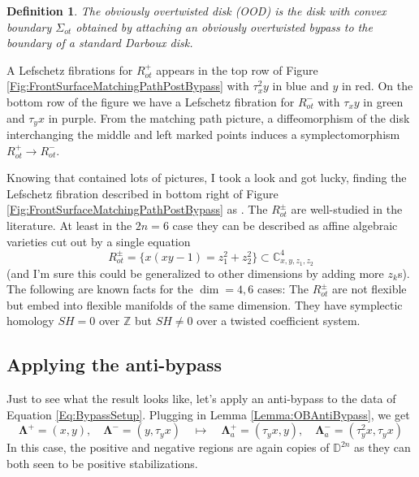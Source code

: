 \documentclass[11pt]{amsart}
\newcommand{\thicc}[1]{\pmb{#1}}
\newcommand{\C}{\mathbb{C}}
\newcommand{\Z}{\mathbb{Z}}
\newcommand{\disk}{\mathbb{D}}
\newcommand{\Leg}{\Lambda}
\newcommand{\thiccPosLeg}{\thicc{\Leg}^{+}}
\newcommand{\thiccNegLeg}{\thicc{\Leg}^{-}}
\newtheorem{defn}[thm]{Definition}
\begin{document}
\begin{defn}\label{Def:OOD}
The \emph{obviously overtwisted disk} (OOD) is the disk with convex boundary $\Sigma_{ot}$ obtained by attaching an obviously overtwisted bypass to the boundary of a standard Darboux disk.
\end{defn}

A Lefschetz fibrations for $R^{+}_{ot}$ appears in the top row of Figure \ref{Fig:FrontSurfaceMatchingPathPostBypass} with $\tau_{x}^{2}y$ in blue and $y$ in red. On the bottom row of the figure we have a Lefschetz fibration for $R^{-}_{ot}$ with $\tau_{x}y$ in green and $\tau_{y}x$ in purple. From the matching path picture, a diffeomorphism of the disk interchanging the middle and left marked points induces a symplectomorphism $R^{+}_{ot} \rightarrow R^{-}_{ot}$.

Knowing that \cite{CM:LegendrianFronts} contained lots of pictures, I took a look and got lucky, finding the Lefschetz fibration described in bottom right of Figure \ref{Fig:FrontSurfaceMatchingPathPostBypass} as \cite[Figure 28]{CM:LegendrianFronts}. The $R^{\pm}_{ot}$ are well-studied in the literature. At least in the $2n=6$ case they can be described as affine algebraic varieties cut out by a single equation
\begin{equation*}
R^{\pm}_{ot} = \{ x(xy - 1) = z_{1}^{2} + z_{2}^{2} \} \subset \C^{4}_{x, y, z_{1}, z_{2}}
\end{equation*}
(and I'm sure this could be generalized to other dimensions by adding more $z_{k}$s). The following are known facts for the $\dim=4, 6$ cases: The $R^{\pm}_{ot}$ are not flexible but embed into flexible manifolds of the same dimension. They have symplectic homology $SH = 0$ over $\Z$ but $SH \neq 0$ over a twisted coefficient system.

\subsection{Applying the anti-bypass}

Just to see what the result looks like, let's apply an anti-bypass to the data of Equation \eqref{Eq:BypassSetup}. Plugging in Lemma \ref{Lemma:OBAntiBypass}, we get
\begin{equation*}
\thiccPosLeg = (x, y), \quad \thiccNegLeg = (y, \tau_{y}x) \quad \mapsto \quad \thiccPosLeg_{a} = (\tau_{y}x, y), \quad \thiccNegLeg_{a} = (\tau_{y}^{2}x, \tau_{y}x)
\end{equation*}
In this case, the positive and negative regions are again copies of $\disk^{2n}$ as they can both seen to be positive stabilizations.
\end{document}

